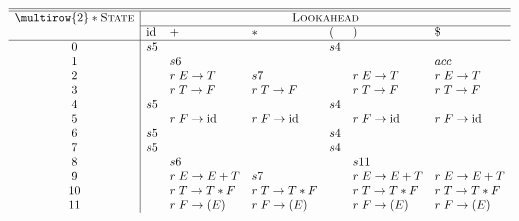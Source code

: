 \centering
\small
$\begin{array}{c|llllll}
\hline\hline
\multirow{2}*{\textsc{State}} & \multicolumn{6}{c}{\textsc{Lookahead}} \\\cline{2-7}
                             & \text{id} & + & * & ( & ) & \$\\
\hline
0  & s5 &    &    & s4 &    &  \\
1  &    & s6 &    &    &    & acc           \\
2  &    & r \;E\to T & s7 &    & r \;E\to T & r \;E\to T  \\
3  &    & r \; T \to F & r \; T \to F &    & r \; T \to F & r \; T \to F \\
4  & s5 &    &    & s4 &    &  \\
5  &    & r \; F \to \text{id} & r \; F \to \text{id} &    & r \; F \to \text{id} & r \; F \to \text{id} \\
6  & s5 &    &    & s4 &    &  \\
7  & s5 &    &    & s4 &    &  \\
8  &    & s6 &    &    & s11&  \\
9  &    & r \; E \to E+T & s7 &    & r \; E \to E+T & r \; E \to E+T \\
10 &    & r \; T \to T * F & r \; T \to T * F &    & r \; T \to T * F & r \; T \to T * F  \\
11 &    & r \; F \to (E) & r \; F \to (E) &    & r \; F \to (E) & r \; F \to (E)
\end{array}$